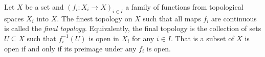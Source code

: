 

%	
%	
%	

\begin{definition}
	\label{definition: final topologies}
	
	Let $X$ be a set and $(f_i\colon X_i \to X)_{i\in I}$ a family of functions from topological spaces $X_i$ into $X$. The finest topology on $X$ such that all maps $f_i$ are continuous is called the \emph{final topology}. Equivalently, the final topology is the collection of sets $U\subseteq X$ such that $f_i^{-1}(U)$ is open in $X_i$ for any $i\in I$. That is a subset of $X$ is open if and only if its preimage under any $f_i$ is open.
\end{definition}

%	

